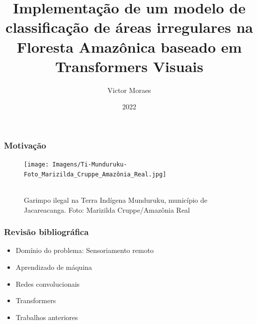 \documentclass{beamer}
\title{Implementação de um modelo de classificação de áreas irregulares na Floresta Amazônica baseado em Transformers Visuais}
\author{Victor Moraes}
\institute{UFMG}
\date{2022}
\begin{document}
\frame{\titlepage}

\begin{frame}
\frametitle{Motivação}  

    \begin{figure}[!h]
    \centering
    \texttt{[image: Imagens/Ti-Munduruku-Foto\_Marizilda\_Cruppe\_Amazônia\_Real.jpg]}
    \caption[width=0.2\columnwidth]{\\\small Garimpo ilegal na Terra Indígena Munduruku, município de Jacareacanga. Foto: Marizilda Cruppe/Amazônia Real}
    \label{fig:garimpo}
    \end{figure}


\end{frame}

\begin{frame}
    \frametitle{Revisão bibliográfica }
\begin{itemize}
    \item Domínio do problema: Sensoriamento remoto
    \item Aprendizado de máquina
    \item Redes convolucionais
    \item Transformers
    \item Trabalhos anteriores
\end{itemize}

\end{frame}
\end{document}
